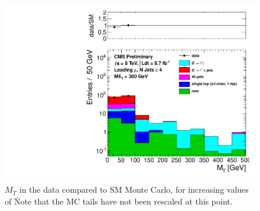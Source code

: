 \begin{figure}[hbt]
\begin{center}
        \includegraphics[width=0.5\linewidth]{plots/mt_met300_muo.pdf}

    \caption{$M_T$ in the data compared to SM Monte Carlo, for
      increasing values of \met\.  Note that the MC tails have not
      been rescaled at this point.
\label{fig:mtsig2}
}  
      \end{center}
\end{figure}


